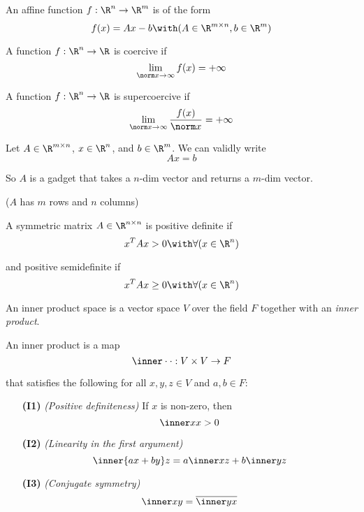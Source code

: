 
\label{dcb7f73}

An affine function $f:\R^n\to\R^m$ is of the form
$$
	f(x)=Ax-b\with(A\in\R^{m\times n},b\in\R^m)
$$

\label{e9c7871}

A function $f:\R^n\to\R$ is coercive if
$$
	\lim_{\norm x\to\infty}f(x)=+\infty
$$

\label{a0444cc}

A function $f:\R^n\to\R$ is supercoercive if
$$
	\lim_{\norm x\to\infty}\frac{f(x)}{\norm x}=+\infty
$$


\label{d8bd136}

Let $A\in\R^{m\times n}$, $x\in\R^n$, and $b\in\R^m$. We can validly
write
$$
	Ax = b
$$

So $A$ is a gadget that takes a $n$-dim vector and returns a $m$-dim
vector.

($A$ has $m$ rows and $n$ columns)

\label{e25e722}

A symmetric matrix $A\in\R^{n\times n}$ is positive definite if
$$
	x^TAx>0\with\forall(x\in\R^n)
$$

and positive semidefinite if
$$
	x^TAx\geq0\with\forall(x\in\R^n)
$$

\label{cebd07a}

An inner product space is a vector space $V$ over the field $F$
together with an \textit{inner product}.

An inner product is a map
$$
	\inner\cdot\cdot:V\times V\to F
$$

that satisfies the following for all $x,y,z\in V$ and $a,b\in F$:
\begin{enumerate}
	\item[\textbf{(I1)}] \textit{(Positive definiteness)} If $x$ is
	      non-zero, then
	      $$
		      \inner xx>0
	      $$
	\item[\textbf{(I2)}] \textit{(Linearity in the first argument)}
	      $$
		      \inner{ax+by}z = a\inner xz + b\inner yz
	      $$
	\item[\textbf{(I3)}] \textit{(Conjugate symmetry)}
	      $$
		      \inner xy=\overline{\inner yx}
	      $$
\end{enumerate}

